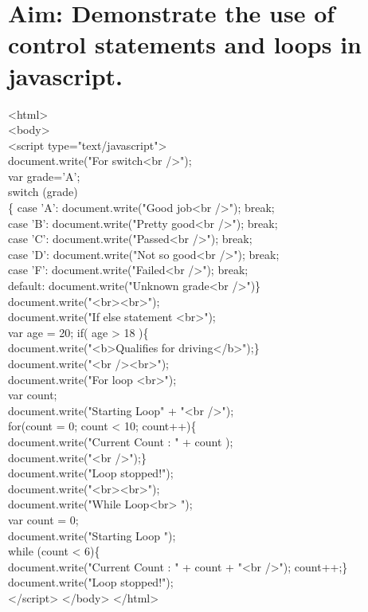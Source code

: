 \section*{\fontsize{16}{14}\selectfont Aim: Demonstrate the use of control statements and loops in javascript.}
<html>\\
<body>\\
<script type="text/javascript">\\
document.write("For switch<br />");\\
var grade='A';\\
switch (grade)\\
\{ case 'A': document.write("Good job<br />"); break;\\
case 'B': document.write("Pretty good<br />"); break;\\
case 'C': document.write("Passed<br />"); break;\\
case 'D': document.write("Not so good<br />"); break;\\
case 'F': document.write("Failed<br />"); break;\\
default:  document.write("Unknown grade<br />")\}\\
document.write("<br><br>");\\
document.write("If else statement <br>");\\
var age = 20; if( age > 18 )\{\\
document.write("<b>Qualifies for driving</b>");\}\\
document.write("<br /><br>");\\
document.write("For loop <br>");\\
var count;\\
document.write("Starting Loop" + "<br />");\\
for(count = 0; count < 10; count++)\{\\
               document.write("Current Count : " + count );\\
               document.write("<br />");\}\\
               document.write("Loop stopped!");\\
       document.write("<br><br>");\\
       document.write("While Loop<br> ");\\
       var count = 0;\\
               document.write("Starting Loop ");\\
          while (count < 6)\{\\
               document.write("Current Count : " + count + "<br />"); count++;\}\\
               document.write("Loop stopped!");\\
      </script> </body> </html>

